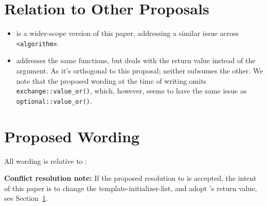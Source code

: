 \documentclass[11pt]{article}
\begin{document}
\section{Relation to Other Proposals}%
\label{sec:relation}

\begin{itemize}
\item\cite{P2248} is a wider-scope version of this paper, addressing a
  similar issue across \texttt{<algorithm>}.
\item\cite{LWG3424} addresses the same functions, but deals with the
  return value instead of the argument. As it's orthogonal to this
  proposal; neither subsumes the other. We note that the proposed
  wording at the time of writing omits \texttt{exchange::value\_or()},
  which, however, seems to have the same issue as
  \texttt{optional::value\_or()}.
\end{itemize}

\section{Proposed Wording}

All wording is relative to \cite{cpp2b}:

\textbf{Conflict resolution note:} If the proposed resolution to
\cite{LWG3424} is accepted, the intent of this paper is to change
the template-initializer-list, and adopt \cite{LWG3424}'s return
value, see Section~\ref{sec:relation}.
\end{document}
